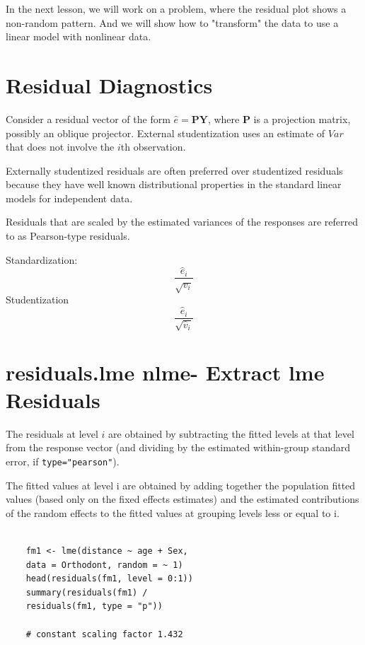 \documentclass[a4paper,12pt]{article}
\begin{document}
In the next lesson, we will work on a problem, where the residual plot shows a non-random pattern. And we will show how to "transform" the data to use a linear model with nonlinear data.


\section{Residual Diagnostics}

Consider a residual vector of the form $\hat{e} = \boldsymbol{PY} $, where $\boldsymbol{P}$ is a projection matrix, possibly an oblique projector.
External studentization uses an estimate of $Var$ that does not involve the $i$th observation.

Externally studentized residuals are often preferred over studentized residuals because they have well known distributional
properties in the standard linear models for independent data.

Residuals that are scaled by the estimated variances of the responses are referred to as Pearson-type residuals.

Standardization: \[ \frac{\hat{e}_i}{\sqrt{v_i}}\]
Studentization \[ \frac{\hat{e}_i}{\sqrt{\hat{v}_i}}\]






\section{residuals.lme {nlme}- Extract lme Residuals}

The residuals at level $i$ are obtained by subtracting the fitted levels at that level from the response vector (and dividing by the estimated within-group standard error, if \texttt{type="pearson"}). 

The fitted values at level i are obtained by adding together the population fitted values (based only on the fixed effects estimates) and the estimated contributions of the random effects to the fitted values at grouping levels less or equal to i.


\begin{framed}
	\begin{verbatim}
	
	fm1 <- lme(distance ~ age + Sex, 
	data = Orthodont, random = ~ 1)
	head(residuals(fm1, level = 0:1))
	summary(residuals(fm1) /
	residuals(fm1, type = "p")) 
	
	# constant scaling factor 1.432
	
	\end{verbatim}
\end{framed}
\end{document}
